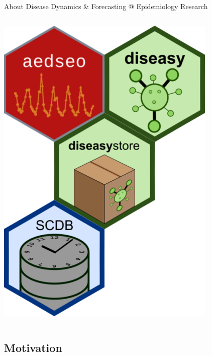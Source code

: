 \documentclass[aspectratio=169]{beamer}
\begin{document}
\begin{frame}{About Disease Dynamics \& Forecasting @ Epidemiology
Research}
\begin{columns}
\begin{column}{.28\textwidth}
\includegraphics[width=0.75\linewidth]{../figures/r_packages} 

 \normalsize
\end{column}
\end{columns}
\end{frame}

\hypertarget{motivation}{%
\subsection{Motivation}\label{motivation}}
\end{document}
